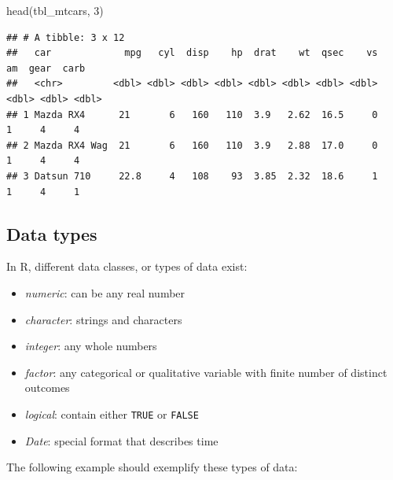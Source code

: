 \documentclass[
  12pt,
  oneside]{book}
\newenvironment{Shaded}{\begin{snugshade}}{\end{snugshade}}
\newcommand{\DecValTok}[1]{\textcolor[rgb]{0.00,0.00,0.81}{#1}}
\newcommand{\FunctionTok}[1]{\textcolor[rgb]{0.00,0.00,0.00}{#1}}
\newcommand{\NormalTok}[1]{#1}
\providecommand{\tightlist}{%
  \setlength{\itemsep}{0pt}\setlength{\parskip}{0pt}}
\theoremstyle{definition}
\theoremstyle{definition}
\theoremstyle{definition}
\theoremstyle{definition}
\theoremstyle{remark}
\begin{document}
\begin{Shaded}
\begin{Highlighting}[]
\FunctionTok{head}\NormalTok{(tbl\_mtcars, }\DecValTok{3}\NormalTok{)}
\end{Highlighting}
\end{Shaded}

\begin{verbatim}
## # A tibble: 3 x 12
##   car             mpg   cyl  disp    hp  drat    wt  qsec    vs    am  gear  carb
##   <chr>         <dbl> <dbl> <dbl> <dbl> <dbl> <dbl> <dbl> <dbl> <dbl> <dbl> <dbl>
## 1 Mazda RX4      21       6   160   110  3.9   2.62  16.5     0     1     4     4
## 2 Mazda RX4 Wag  21       6   160   110  3.9   2.88  17.0     0     1     4     4
## 3 Datsun 710     22.8     4   108    93  3.85  2.32  18.6     1     1     4     1
\end{verbatim}

\hypertarget{data-types}{%
\subsection{Data types}\label{data-types}}

In R, different data classes, or types of data exist:

\begin{itemize}
\tightlist
\item
  \emph{numeric}: can be any real number
\item
  \emph{character}: strings and characters
\item
  \emph{integer}: any whole numbers
\item
  \emph{factor}: any categorical or qualitative variable with finite number of distinct outcomes
\item
  \emph{logical}: contain either \texttt{TRUE} or \texttt{FALSE}
\item
  \emph{Date}: special format that describes time
\end{itemize}

The following example should exemplify these types of data:
\end{document}
